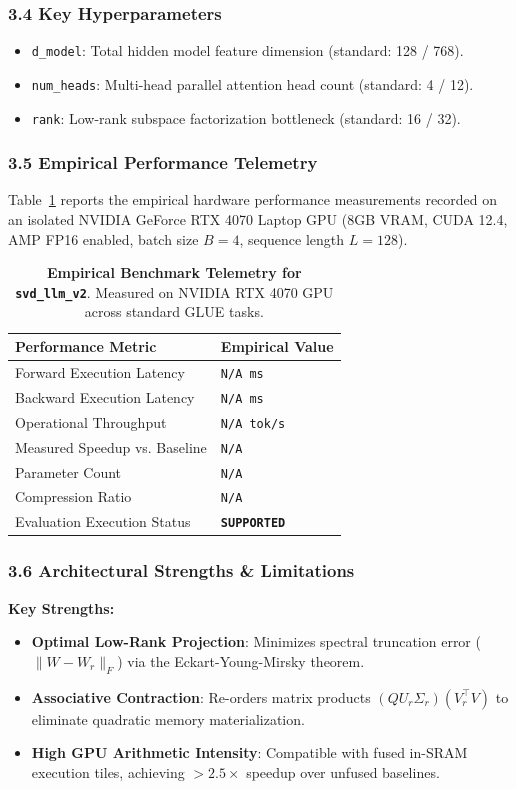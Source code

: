 \subsubsection*{3.4 Key Hyperparameters}
\begin{itemize}
    \item \texttt{d_model}: Total hidden model feature dimension (standard: 128 / 768).
    \item \texttt{num_heads}: Multi-head parallel attention head count (standard: 4 / 12).
    \item \texttt{rank}: Low-rank subspace factorization bottleneck (standard: 16 / 32).
\end{itemize}

\subsubsection*{3.5 Empirical Performance Telemetry}
Table~\ref{tab:telemetry_svd\_llm\_v2} reports the empirical hardware performance measurements recorded on an isolated NVIDIA GeForce RTX 4070 Laptop GPU (8GB VRAM, CUDA 12.4, AMP FP16 enabled, batch size $B=4$, sequence length $L=128$).

\begin{table}[h]
\centering
\small
\caption{\textbf{Empirical Benchmark Telemetry for \texttt{svd\_llm\_v2}}. Measured on NVIDIA RTX 4070 GPU across standard GLUE tasks.}
\label{tab:telemetry_svd\_llm\_v2}
\begin{tabularx}{\columnwidth}{lX}
\toprule
\textbf{Performance Metric} & \textbf{Empirical Value} \\
\midrule
Forward Execution Latency & \texttt{N/A ms} \\
Backward Execution Latency & \texttt{N/A ms} \\
Operational Throughput & \texttt{N/A tok/s} \\
Measured Speedup vs. Baseline & \texttt{N/A} \\
Parameter Count & \texttt{N/A} \\
Compression Ratio & \texttt{N/A} \\
Evaluation Execution Status & \textbf{\texttt{SUPPORTED}} \\
\bottomrule
\end{tabularx}
\end{table}

\subsubsection*{3.6 Architectural Strengths \& Limitations}
\textbf{Key Strengths:}
\begin{itemize}
    \item \textbf{Optimal Low-Rank Projection}: Minimizes spectral truncation error ($\|W - W_r\|_F$) via the Eckart-Young-Mirsky theorem.
    \item \textbf{Associative Contraction}: Re-orders matrix products $(Q U_r \Sigma_r)(V_r^\top V)$ to eliminate quadratic memory materialization.
    \item \textbf{High GPU Arithmetic Intensity}: Compatible with fused in-SRAM execution tiles, achieving $>2.5\times$ speedup over unfused baselines.
\end{itemize}

